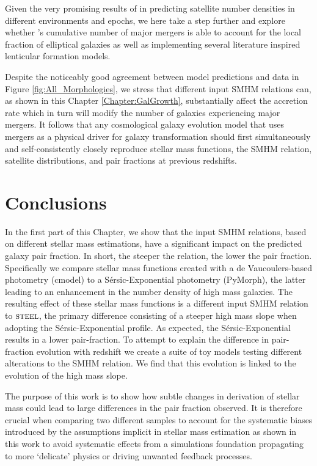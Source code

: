 Given the very promising results of \steel in predicting satellite number densities in different environments and epochs, we here take a step further and explore whether \steel's cumulative number of major mergers is able to account for the local fraction of elliptical galaxies as well as implementing several literature inspired lenticular formation models. 

Despite the noticeably good agreement between model predictions and data in Figure \ref{fig:All_Morphologies}, we stress that different input SMHM relations can, as shown in this Chapter \ref{Chapter:GalGrowth}, substantially affect the accretion rate which in turn will modify the number of galaxies experiencing major mergers. It follows that any cosmological galaxy evolution model that uses mergers as a physical driver for galaxy transformation should first simultaneously and self-consistently closely reproduce stellar mass functions, the SMHM relation, satellite distributions, and pair fractions at previous redshifts.

\section{Conclusions}
\label{sec:Conclusions}

In the first part of this Chapter, we show that the input SMHM relations, based on different stellar mass estimations, have a significant impact on the predicted galaxy pair fraction. In short, the steeper the relation, the lower the pair fraction. Specifically we compare stellar mass functions created with a de Vaucoulers-based photometry (cmodel) to a S\'ersic-Exponential photometry (PyMorph), the latter leading to an enhancement in the number density of high mass galaxies. The resulting effect of these stellar mass functions is a different input SMHM relation to $\textsc{steel}$, the primary difference consisting of a steeper high mass slope when adopting the S\'ersic-Exponential profile. As expected, the S\'ersic-Exponential results in a lower pair-fraction. To attempt to explain the difference in pair-fraction evolution with redshift we create a suite of toy models testing different alterations to the SMHM relation. We find that this evolution is linked to the evolution of the high mass slope.

The purpose of this work is to show how subtle changes in derivation of stellar mass could lead to large differences in the pair fraction observed. It is therefore crucial when comparing two different samples to account for the systematic biases introduced by the assumptions implicit in stellar mass estimation as shown in this work to avoid systematic effects from a simulations foundation propagating to more `delicate' physics or driving unwanted feedback processes.

